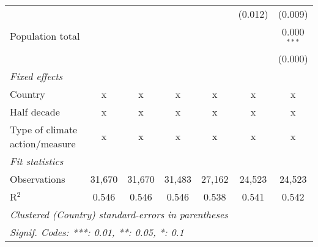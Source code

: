 \begin{tabular}{lcccccc}
                                              &         &         &         &             & (0.012)      & (0.009)\\   
   Population total                           &         &         &         &             &              & 0.000$^{***}$\\   
                                              &         &         &         &             &              & (0.000)\\   
   \emph{Fixed effects}\\
   Country                                    & x       & x       & x       & x           & x            & x\\  
   Half decade                                & x       & x       & x       & x           & x            & x\\  
   Type of climate action/measure             & x       & x       & x       & x           & x            & x\\  
   \midrule \emph{Fit statistics}\\
   Observations                               & 31,670  & 31,670  & 31,483  & 27,162      & 24,523       & 24,523\\  
   R$^2$                                      & 0.546   & 0.546   & 0.546   & 0.538       & 0.541        & 0.542\\  
   \midrule
   \multicolumn{7}{l}{\emph{Clustered (Country) standard-errors in parentheses}}\\
   \multicolumn{7}{l}{\emph{Signif. Codes: ***: 0.01, **: 0.05, *: 0.1}}\\
\end{tabular}
\par\endgroup


